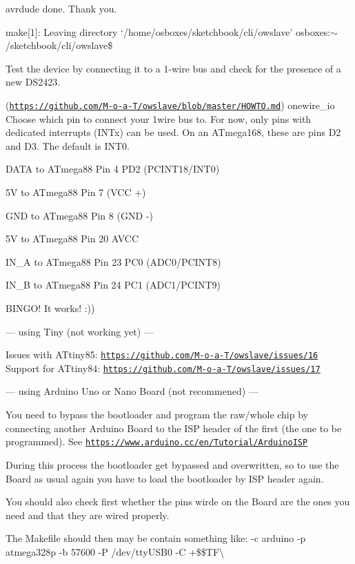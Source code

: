 avrdude done. Thank you.

make\mbox{[}1\mbox{]}\-: Leaving directory `/home/osboxes/sketchbook/cli/owslave' osboxes\-:$\sim$/sketchbook/cli/owslave\$

Test the device by connecting it to a 1-\/wire bus and check for the presence of a new D\-S2423.

(\href{https://github.com/M-o-a-T/owslave/blob/master/HOWTO.md}{\tt https\-://github.\-com/\-M-\/o-\/a-\/\-T/owslave/blob/master/\-H\-O\-W\-T\-O.\-md}) onewire\-\_\-io Choose which pin to connect your 1wire bus to. For now, only pins with dedicated interrupts (I\-N\-Tx) can be used. On an A\-Tmega168, these are pins D2 and D3. The default is I\-N\-T0.


\begin{DoxyItemize}
\item D\-A\-T\-A to A\-Tmega88 Pin 4 P\-D2 (P\-C\-I\-N\-T18/\-I\-N\-T0)
\item 5\-V to A\-Tmega88 Pin 7 (V\-C\-C +)
\item G\-N\-D to A\-Tmega88 Pin 8 (G\-N\-D -\/)
\item 5\-V to A\-Tmega88 Pin 20 A\-V\-C\-C
\item I\-N\-\_\-\-A to A\-Tmega88 Pin 23 P\-C0 (A\-D\-C0/\-P\-C\-I\-N\-T8)
\item I\-N\-\_\-\-B to A\-Tmega88 Pin 24 P\-C1 (A\-D\-C1/\-P\-C\-I\-N\-T9)
\end{DoxyItemize}

B\-I\-N\-G\-O! It works! \-:))

--- using Tiny (not working yet) ---

Issues with A\-Ttiny85\-: \href{https://github.com/M-o-a-T/owslave/issues/16}{\tt https\-://github.\-com/\-M-\/o-\/a-\/\-T/owslave/issues/16} Support for A\-Ttiny84\-: \href{https://github.com/M-o-a-T/owslave/issues/17}{\tt https\-://github.\-com/\-M-\/o-\/a-\/\-T/owslave/issues/17}

--- using Arduino Uno or Nano Board (not recommened) ---

You need to bypass the bootloader and program the raw/whole chip by connecting another Arduino Board to the I\-S\-P header of the first (the one to be programmed). See \href{https://www.arduino.cc/en/Tutorial/ArduinoISP}{\tt https\-://www.\-arduino.\-cc/en/\-Tutorial/\-Arduino\-I\-S\-P}

During this process the bootloader get bypassed and overwritten, so to use the Board as usual again you have to load the bootloader by I\-S\-P header again.

You should also check first whether the pins wirde on the Board are the ones you need and that they are wired properly.

The Makefile should then may be contain something like\-:  -\/c arduino -\/p atmega328p -\/b 57600 -\/\-P /dev/tty\-U\-S\-B0 -\/\-C +\$\$\-T\-F\textbackslash{} 